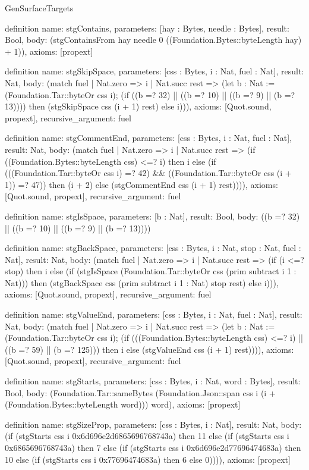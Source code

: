 \begin{lexlean}{GenSurfaceTargets}
\begin{semanticmodule}
definition{
  name: stgContains,
  parameters: [hay : Bytes, needle : Bytes],
  result: Bool,
  body: (stgContainsFrom hay needle 0 ((Foundation.Bytes::byteLength hay) + 1)),
  axioms: [propext]
}

definition{
  name: stgSkipSpace,
  parameters: [css : Bytes, i : Nat, fuel : Nat],
  result: Nat,
  body: (match fuel
    | Nat.zero => i
    | Nat.succ rest => (let b : Nat := (Foundation.Tar::byteOr css i); (if ((b =? 32) || ((b =? 10) || ((b =? 9) || (b =? 13)))) then (stgSkipSpace css (i + 1) rest) else i))),
  axioms: [Quot.sound, propext],
  recursive_argument: fuel
}

definition{
  name: stgCommentEnd,
  parameters: [css : Bytes, i : Nat, fuel : Nat],
  result: Nat,
  body: (match fuel
    | Nat.zero => i
    | Nat.succ rest => (if ((Foundation.Bytes::byteLength css) <=? i) then i else (if (((Foundation.Tar::byteOr css i) =? 42) && ((Foundation.Tar::byteOr css (i + 1)) =? 47)) then (i + 2) else (stgCommentEnd css (i + 1) rest)))),
  axioms: [Quot.sound, propext],
  recursive_argument: fuel
}

definition{
  name: stgIsSpace,
  parameters: [b : Nat],
  result: Bool,
  body: ((b =? 32) || ((b =? 10) || ((b =? 9) || (b =? 13))))
}

definition{
  name: stgBackSpace,
  parameters: [css : Bytes, i : Nat, stop : Nat, fuel : Nat],
  result: Nat,
  body: (match fuel
    | Nat.zero => i
    | Nat.succ rest => (if (i <=? stop) then i else (if (stgIsSpace (Foundation.Tar::byteOr css (prim subtract i 1 : Nat))) then (stgBackSpace css (prim subtract i 1 : Nat) stop rest) else i))),
  axioms: [Quot.sound, propext],
  recursive_argument: fuel
}

definition{
  name: stgValueEnd,
  parameters: [css : Bytes, i : Nat, fuel : Nat],
  result: Nat,
  body: (match fuel
    | Nat.zero => i
    | Nat.succ rest => (let b : Nat := (Foundation.Tar::byteOr css i); (if (((Foundation.Bytes::byteLength css) <=? i) || ((b =? 59) || (b =? 125))) then i else (stgValueEnd css (i + 1) rest)))),
  axioms: [Quot.sound, propext],
  recursive_argument: fuel
}

definition{
  name: stgStarts,
  parameters: [css : Bytes, i : Nat, word : Bytes],
  result: Bool,
  body: (Foundation.Tar::sameBytes (Foundation.Json::span css i (i + (Foundation.Bytes::byteLength word))) word),
  axioms: [propext]
}

definition{
  name: stgSizeProp,
  parameters: [css : Bytes, i : Nat],
  result: Nat,
  body: (if (stgStarts css i 0x6d696e2d6865696768743a) then 11 else (if (stgStarts css i 0x6865696768743a) then 7 else (if (stgStarts css i 0x6d696e2d77696474683a) then 10 else (if (stgStarts css i 0x77696474683a) then 6 else 0)))),
  axioms: [propext]
}


\end{semanticmodule}
\end{lexlean}
